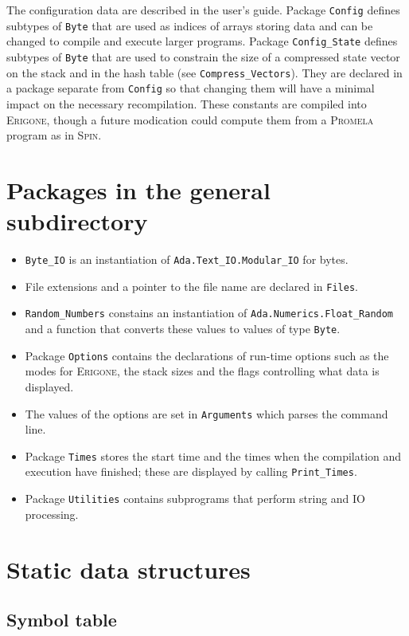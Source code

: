 \documentclass[11pt]{article}
\newcommand*{\prg}{\textsc{Erigone}}
\newcommand*{\spn}{\textsc{Spin}}
\newcommand*{\prm}{\textsc{Promela}}
\newcommand*{\p}[1]{\texttt{#1}}
\begin{document}
The configuration data are described in the user's guide. Package
\p{Config} defines subtypes of \p{Byte} that are used as indices of
arrays storing data and can be changed to compile and execute larger
programs. Package \p{Config\_State} defines subtypes of \p{Byte} that
are used to constrain the size of a compressed state vector on the stack
and in the hash table (see \p{Compress\_Vectors}). They are declared in
a package separate from \p{Config} so that changing them will have a
minimal impact on the necessary recompilation. These constants are
compiled into \prg{}, though a future modication could compute them from
a \prm{} program as in \spn{}.

\section{Packages in the general subdirectory}
\begin{itemize}
\item \p{Byte\_IO} is an instantiation of
\p{Ada.Text\_IO.Modular\_IO} for bytes.
\item File extensions and a pointer to the file name are declared in \p{Files}.
\item \p{Random\_Numbers} constains an instantiation of
\p{Ada.Numerics.Float\_Random} and a function that converts these values to values of
type \p{Byte}.
\item Package \p{Options} contains the declarations of run-time options
such as the modes for \prg{}, the stack sizes and the flags controlling
what data is displayed.
\item The values of the options are set in \p{Arguments} which parses
the command line.
\item Package \p{Times} stores the start time and the times when the
compilation and execution have finished; these are displayed
by calling \p{Print\_Times}.
\item Package \p{Utilities} contains subprograms that perform string and
IO processing.
\end{itemize}

\section{Static data structures}

\subsection{Symbol table}
\end{document}
